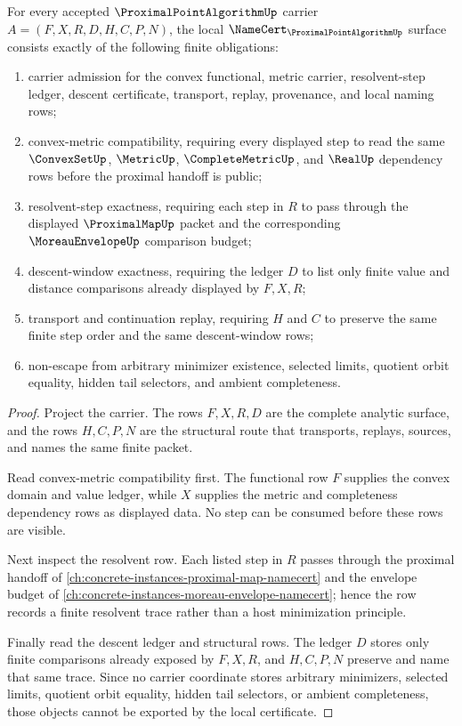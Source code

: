 \begin{theorem}
\label{thm:proximal-point-algorithm-namecert-obligations}
For every accepted $\ProximalPointAlgorithmUp$ carrier $A=(F,X,R,D,H,C,P,N)$, the local $\NameCert_{\ProximalPointAlgorithmUp}$ surface consists exactly of the following finite obligations:
\begin{enumerate}
\item carrier admission for the convex functional, metric carrier, resolvent-step ledger, descent certificate, transport, replay, provenance, and local naming rows;
\item convex-metric compatibility, requiring every displayed step to read the same $\ConvexSetUp$, $\MetricUp$, $\CompleteMetricUp$, and $\RealUp$ dependency rows before the proximal handoff is public;
\item resolvent-step exactness, requiring each step in $R$ to pass through the displayed $\ProximalMapUp$ packet and the corresponding $\MoreauEnvelopeUp$ comparison budget;
\item descent-window exactness, requiring the ledger $D$ to list only finite value and distance comparisons already displayed by $F,X,R$;
\item transport and continuation replay, requiring $H$ and $C$ to preserve the same finite step order and the same descent-window rows;
\item non-escape from arbitrary minimizer existence, selected limits, quotient orbit equality, hidden tail selectors, and ambient completeness.
\end{enumerate}
\end{theorem}
\begin{proof}
Project the carrier. The rows $F,X,R,D$ are the complete analytic surface, and the rows $H,C,P,N$ are the structural route that transports, replays, sources, and names the same finite packet.

Read convex-metric compatibility first. The functional row $F$ supplies the convex domain and value ledger, while $X$ supplies the metric and completeness dependency rows as displayed data. No step can be consumed before these rows are visible.

Next inspect the resolvent row. Each listed step in $R$ passes through the proximal handoff of \autoref{ch:concrete-instances-proximal-map-namecert} and the envelope budget of \autoref{ch:concrete-instances-moreau-envelope-namecert}; hence the row records a finite resolvent trace rather than a host minimization principle.

Finally read the descent ledger and structural rows. The ledger $D$ stores only finite comparisons already exposed by $F,X,R$, and $H,C,P,N$ preserve and name that same trace. Since no carrier coordinate stores arbitrary minimizers, selected limits, quotient orbit equality, hidden tail selectors, or ambient completeness, those objects cannot be exported by the local certificate.
\end{proof}

